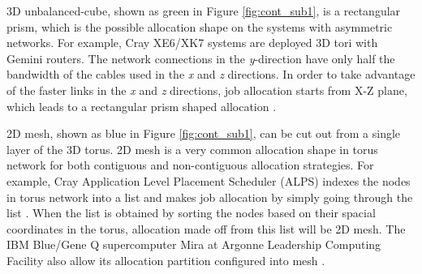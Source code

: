 3D unbalanced-cube, shown as green in Figure \ref{fig:cont_sub1}, is a rectangular prism, which is the possible allocation shape on the systems with asymmetric networks. For example, Cray XE6/XK7 systems are deployed 3D tori with Gemini routers. The network connections in the \emph{y}-direction have only half the bandwidth of the cables used in the \emph{x} and \emph{z} directions. In order to take advantage of the faster links in the \emph{x} and \emph{z} directions, job allocation starts from X-Z plane, which leads to a rectangular prism shaped allocation \cite{RF}.

2D mesh, shown as blue in Figure \ref{fig:cont_sub1}, can be cut out from a single layer of the 3D torus. 2D mesh is a very common allocation shape in torus network for both contiguous and non-contiguous allocation strategies. For example, Cray Application Level Placement Scheduler (ALPS) indexes the nodes in torus network into a list and makes job allocation by simply going through the list \cite{carl-cug}. When the list is obtained by sorting the nodes based on their spacial coordinates in the torus, allocation made off from this list will be 2D mesh. The IBM Blue/Gene Q supercomputer Mira at Argonne Leadership Computing Facility also allow its allocation partition configured into mesh \cite{zhou-ipdps}. 

